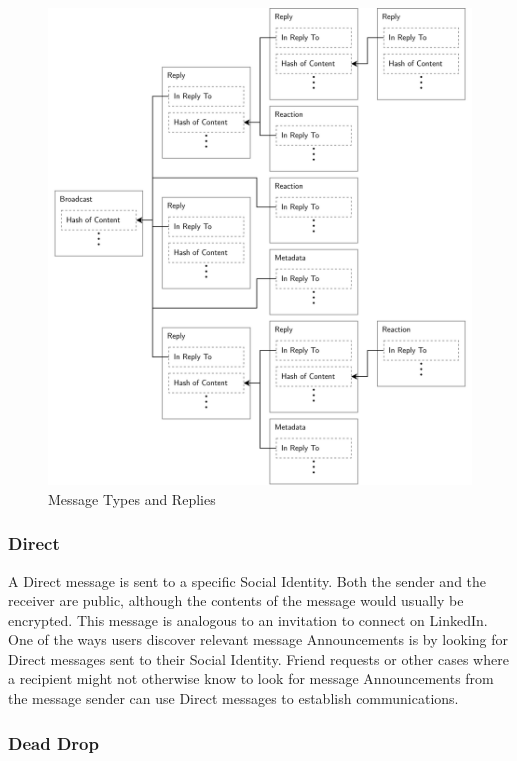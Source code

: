 \documentclass[12pt,letterpaper]{article}
\begin{document}
\begin{figure}
	\includegraphics[width=\linewidth]{figures/Message Types and Replies.png}
	\caption{Message Types and Replies}
	\label{fig:6}
\end{figure}

\subsubsection{Direct}

A Direct message is sent to a specific Social Identity. Both the sender and the receiver are
public, although the contents of the message would usually be encrypted. This message is
analogous to an invitation to connect on LinkedIn. One of the ways users discover relevant
message Announcements is by looking for Direct messages sent to their Social
Identity. Friend requests or other cases where a recipient might not otherwise know to look
for message Announcements from the message sender can use Direct messages to establish
communications.

\subsubsection{Dead Drop}
\end{document}
